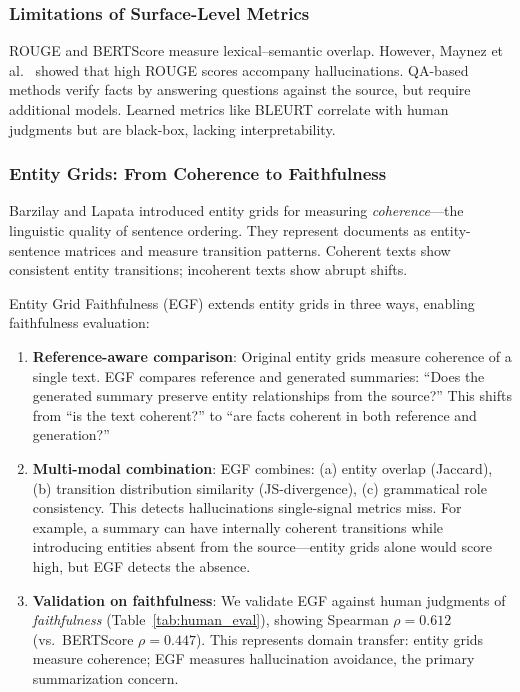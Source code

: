 \documentclass[11pt,a4paper]{article}
\begin{document}
\subsubsection{Limitations of Surface-Level Metrics}

ROUGE and BERTScore measure lexical--semantic overlap. However, Maynez et al.\ \cite{maynez2021faithfulness} showed that high ROUGE scores accompany hallucinations. QA-based methods \cite{wang2020asking, rashkin2021evaluating} verify facts by answering questions against the source, but require additional models. Learned metrics like BLEURT \cite{sellam2020bleurt} correlate with human judgments but are black-box, lacking interpretability.

\subsubsection{Entity Grids: From Coherence to Faithfulness}

Barzilay and Lapata \cite{barzilay2008modeling} introduced entity grids for measuring \emph{coherence}---the linguistic quality of sentence ordering. They represent documents as entity-sentence matrices and measure transition patterns. Coherent texts show consistent entity transitions; incoherent texts show abrupt shifts.

Entity Grid Faithfulness (EGF) extends entity grids in three ways, enabling faithfulness evaluation:

\begin{enumerate}
\item \textbf{Reference-aware comparison}: Original entity grids measure coherence of a single text. EGF compares reference and generated summaries: ``Does the generated summary preserve entity relationships from the source?'' This shifts from ``is the text coherent?'' to ``are facts coherent in both reference and generation?''

\item \textbf{Multi-modal combination}: EGF combines: (a) entity overlap (Jaccard), (b) transition distribution similarity (JS-divergence), (c) grammatical role consistency. This detects hallucinations single-signal metrics miss. For example, a summary can have internally coherent transitions while introducing entities absent from the source---entity grids alone would score high, but EGF detects the absence.

\item \textbf{Validation on faithfulness}: We validate EGF against human judgments of \emph{faithfulness} (Table~\ref{tab:human_eval}), showing Spearman $\rho = 0.612$ (vs.\ BERTScore $\rho = 0.447$). This represents domain transfer: entity grids measure coherence; EGF measures hallucination avoidance, the primary summarization concern.
\end{enumerate}
\end{document}
